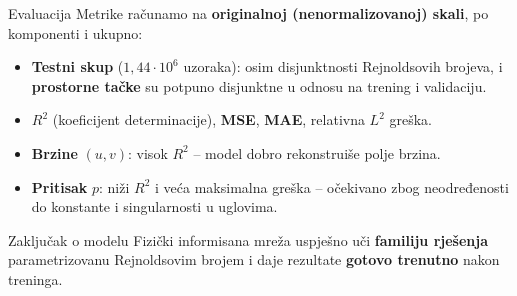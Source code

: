 \documentclass[10pt,aspectratio=169]{beamer}
\begin{document}
\begin{frame}{Evaluacija}
  Metrike računamo na \textbf{originalnoj (nenormalizovanoj) skali}, po komponenti i ukupno:
  \vfill
  \begin{itemize}
    \item \textbf{Testni skup} ($1{,}44 \cdot 10^6$ uzoraka): osim disjunktnosti Rejnoldsovih brojeva, i \textbf{prostorne tačke} su potpuno disjunktne u odnosu na trening i validaciju.
    \item $R^2$ (koeficijent determinacije), \textbf{MSE}, \textbf{MAE}, relativna $L^2$ greška.
    \item \textbf{Brzine} $(u,v)$: visok $R^2$ -- model dobro rekonstruiše polje brzina.
    \item \textbf{Pritisak} $p$: niži $R^2$ i veća maksimalna greška --
          očekivano zbog neodređenosti do konstante i singularnosti u uglovima.
  \end{itemize}
  \vfill
  \begin{block}{Zaključak o modelu}
    Fizički informisana mreža uspješno uči \textbf{familiju rješenja} parametrizovanu
    Rejnoldsovim brojem i daje rezultate \textbf{gotovo trenutno} nakon treninga.
  \end{block}
\end{frame}
\end{document}
